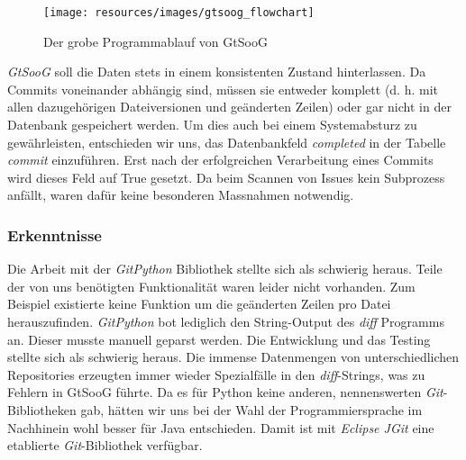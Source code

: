 \documentclass[10pt, a4paper]{article}
\begin{document}
\begin{figure}[h]
	\centering
	\texttt{[image: resources/images/gtsoog\_flowchart]}
	\caption[Programmablauf von GtSooG]{Der grobe Programmablauf von GtSooG}
	\label{fig:gtsoog_flowchart}
\end{figure}

\emph{GtSooG} soll die Daten stets in einem konsistenten Zustand hinterlassen. Da Commits voneinander abhängig sind, müssen sie entweder komplett (d. h. mit allen dazugehörigen Dateiversionen und geänderten Zeilen) oder gar nicht in der Datenbank gespeichert werden.
Um dies auch bei einem Systemabsturz zu gewährleisten, entschieden wir uns, das Datenbankfeld \emph{completed} in der Tabelle \emph{commit} einzuführen. Erst nach der erfolgreichen Verarbeitung eines Commits wird dieses Feld auf True gesetzt. Da beim Scannen von Issues kein Subprozess anfällt, waren dafür keine besonderen Massnahmen notwendig.

\subsubsection{Erkenntnisse} \label{sec:gtsoogfindings}

Die Arbeit mit der \emph{GitPython} Bibliothek stellte sich als schwierig heraus. Teile der von uns benötigten Funktionalität waren leider nicht vorhanden. Zum Beispiel existierte keine Funktion um die geänderten Zeilen pro Datei herauszufinden. \emph{GitPython} bot lediglich den String-Output des \emph{diff} Programms an. Dieser musste manuell geparst werden. Die Entwicklung und das Testing stellte sich als schwierig heraus. Die immense Datenmengen von unterschiedlichen Repositories erzeugten immer wieder Spezialfälle in den \emph{diff}-Strings, was zu Fehlern in GtSooG führte. Da es für Python keine anderen, nennenswerten \emph{Git}-Bibliotheken gab, hätten wir uns bei der Wahl der Programmiersprache im Nachhinein wohl besser für Java entschieden. Damit ist mit \emph{Eclipse JGit} \cite{jgit} eine etablierte \emph{Git}-Bibliothek verfügbar.
\end{document}
